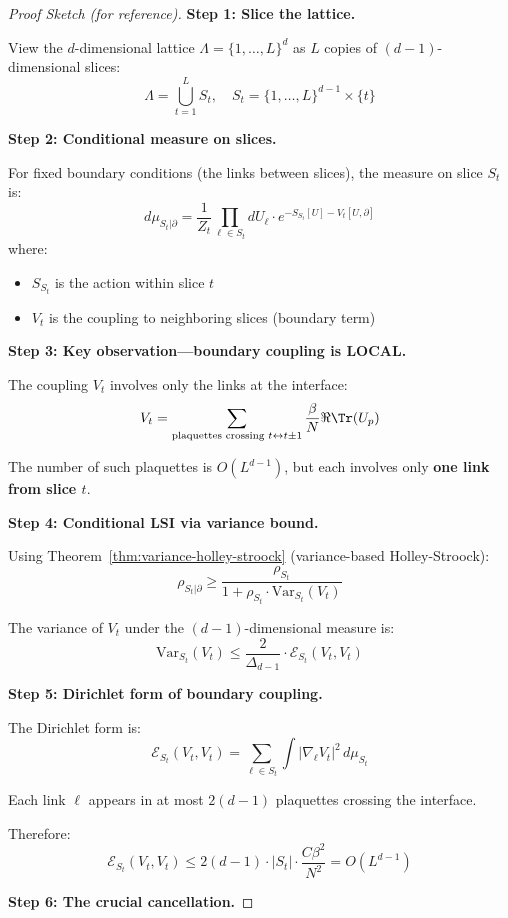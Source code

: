 \begin{proof}[Proof Sketch (for reference)]
\textbf{Step 1: Slice the lattice.}

View the $d$-dimensional lattice $\Lambda = \{1, \ldots, L\}^d$ as $L$ copies of 
$(d-1)$-dimensional slices:
\[
\Lambda = \bigcup_{t=1}^{L} S_t, \quad S_t = \{1, \ldots, L\}^{d-1} \times \{t\}
\]

\textbf{Step 2: Conditional measure on slices.}

For fixed boundary conditions (the links between slices), the measure on slice 
$S_t$ is:
\[
d\mu_{S_t | \partial} = \frac{1}{Z_t} \prod_{\ell \in S_t} dU_\ell \cdot e^{-S_{S_t}[U] - V_t[U, \partial]}
\]
where:
\begin{itemize}
\item $S_{S_t}$ is the action within slice $t$
\item $V_t$ is the coupling to neighboring slices (boundary term)
\end{itemize}

\textbf{Step 3: Key observation—boundary coupling is LOCAL.}

The coupling $V_t$ involves only the links at the interface:
\[
V_t = \sum_{\text{plaquettes crossing } t \leftrightarrow t\pm 1} \frac{\beta}{N}\Re\Tr(U_p)
\]

The number of such plaquettes is $O(L^{d-1})$, but each involves only 
\textbf{one link from slice $t$}.

\textbf{Step 4: Conditional LSI via variance bound.}

Using Theorem~\ref{thm:variance-holley-stroock} (variance-based Holley-Stroock):
\[
\rho_{S_t | \partial} \geq \frac{\rho_{S_t}}{1 + \rho_{S_t} \cdot \mathrm{Var}_{S_t}(V_t)}
\]

The variance of $V_t$ under the $(d-1)$-dimensional measure is:
\[
\mathrm{Var}_{S_t}(V_t) \leq \frac{2}{\Delta_{d-1}} \cdot \mathcal{E}_{S_t}(V_t, V_t)
\]

\textbf{Step 5: Dirichlet form of boundary coupling.}

The Dirichlet form is:
\[
\mathcal{E}_{S_t}(V_t, V_t) = \sum_{\ell \in S_t} \int |\nabla_\ell V_t|^2 \, d\mu_{S_t}
\]

Each link $\ell$ appears in at most $2(d-1)$ plaquettes crossing the interface.

Therefore:
\[
\mathcal{E}_{S_t}(V_t, V_t) \leq 2(d-1) \cdot |S_t| \cdot \frac{C\beta^2}{N^2} = O(L^{d-1})
\]

\textbf{Step 6: The crucial cancellation.}


\end{proof}
